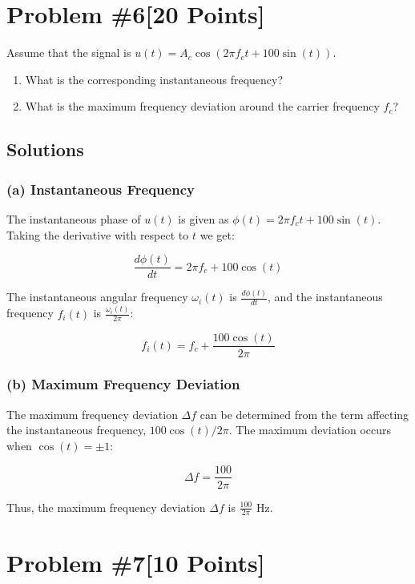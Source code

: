 \documentclass{article}
\begin{document}
\newpage
\section*{Problem \#6[20 Points]}

Assume that the signal is \( u(t) = A_c \cos(2\pi f_c t + 100 \sin(t)) \). 

\begin{enumerate}
    \item What is the corresponding instantaneous frequency?
    \item What is the maximum frequency deviation around the carrier frequency \( f_c \)?
\end{enumerate}

\subsection*{Solutions}

\subsubsection*{(a) Instantaneous Frequency}

The instantaneous phase of \( u(t) \) is given as \( \phi(t) = 2\pi f_c t + 100 \sin(t) \). Taking the derivative with respect to \( t \) we get:

\[
\frac{d\phi(t)}{dt} = 2\pi f_c + 100 \cos(t)
\]

The instantaneous angular frequency \( \omega_i(t) \) is \( \frac{d\phi(t)}{dt} \), and the instantaneous frequency \( f_i(t) \) is \( \frac{\omega_i(t)}{2\pi} \):

\[
f_i(t) = f_c + \frac{100 \cos(t)}{2\pi}
\]

\subsubsection*{(b) Maximum Frequency Deviation}

The maximum frequency deviation \( \Delta f \) can be determined from the term affecting the instantaneous frequency, \( 100 \cos(t) / 2\pi \). The maximum deviation occurs when \( \cos(t) = \pm 1 \):

\[
\Delta f = \frac{100}{2\pi}
\]

Thus, the maximum frequency deviation \( \Delta f \) is \( \frac{100}{2\pi} \) Hz.



\newpage
\section*{Problem \#7[10 Points]}
\end{document}
